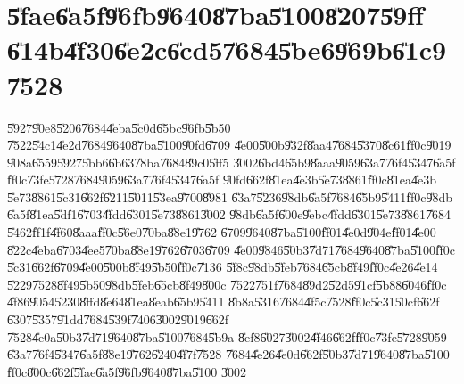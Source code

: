                       

\part{\U{5fae}\U{6a5f}\U{96fb}\U{9640}\U{87ba}\U{5100}\U{8207}\U{59ff}%
\U{614b}\U{4f30}\U{6e2c}\U{6cd5}\U{7684}\U{5be6}\U{969b}\U{61c9}\U{7528}}

\setcounter{xpage}{1}

\U{5927}\U{90e8}\U{5206}\U{7684}\U{4eba}\U{5c0d}\U{65bc}\U{96fb}\U{5b50}%
\U{7522}\U{54c1}\U{4e2d}\U{7684}\U{9640}\U{87ba}\U{5100}\U{90fd}\U{6709}%
\U{4e00}\U{500b}\U{932f}\U{8aa4}\U{7684}\U{5370}\U{8c61}\U{ff0c}\U{9019}%
\U{908a}\U{6559}\U{5927}\U{5bb6}\U{6b63}\U{78ba}\U{7684}\U{89c0}\U{5ff5}%
\U{3002}\U{6bd4}\U{65b9}\U{8aaa}\U{9059}\U{63a7}\U{76f4}\U{5347}\U{6a5f}%
\U{ff0c}\U{73fe}\U{5728}\U{7684}\U{9059}\U{63a7}\U{76f4}\U{5347}\U{6a5f}%
\U{90fd}\U{662f}\U{81ea}\U{4e3b}\U{5e73}\U{8861}\U{ff0c}\U{81ea}\U{4e3b}%
\U{5e73}\U{8861}\U{5c31}\U{662f}\U{6211}\U{5011}\U{53ea}\U{9700}\U{8981}%
\U{63a7}\U{5236}\U{98db}\U{6a5f}\U{7684}\U{65b9}\U{5411}\U{ff0c}\U{98db}%
\U{6a5f}\U{81ea}\U{5df1}\U{6703}\U{4fdd}\U{6301}\U{5e73}\U{8861}\U{3002}%
\U{98db}\U{6a5f}\U{600e}\U{9ebc}\U{4fdd}\U{6301}\U{5e73}\U{8861}\U{7684}%
\U{5462}\U{ff1f}\U{4f60}\U{8aaa}\U{ff0c}\U{56e0}\U{70ba}\U{88e1}\U{9762}%
\U{6709}\U{9640}\U{87ba}\U{5100}\U{ff01}\U{4e0d}\U{904e}\U{ff01}\U{4e00}%
\U{822c}\U{4eba}\U{6703}\U{4ee5}\U{70ba}\U{88e1}\U{9762}\U{6703}\U{6709}%
\U{4e00}\U{9846}\U{50b3}\U{7d71}\U{7684}\U{9640}\U{87ba}\U{5100}\U{ff0c}%
\U{5c31}\U{662f}\U{6709}\U{4e00}\U{500b}\U{8f49}\U{5b50}\U{ff0c}\U{7136}%
\U{5f8c}\U{98db}\U{5feb}\U{7684}\U{65cb}\U{8f49}\U{ff0c}\U{4e26}\U{4e14}%
\U{5229}\U{7528}\U{8f49}\U{5b50}\U{98db}\U{5feb}\U{65cb}\U{8f49}\U{800c}%
\U{7522}\U{751f}\U{7684}\U{89d2}\U{52d5}\U{91cf}\U{5b88}\U{6046}\U{ff0c}%
\U{4f86}\U{9054}\U{5230}\U{8ffd}\U{8e64}\U{81ea}\U{8eab}\U{65b9}\U{5411}%
\U{8b8a}\U{5316}\U{7684}\U{4f5c}\U{7528}\U{ff0c}\U{5c31}\U{50cf}\U{662f}%
\U{6307}\U{5357}\U{91dd}\U{7684}\U{539f}\U{7406}\U{3002}\U{9019}\U{662f}%
\U{7528}\U{4e0a}\U{50b3}\U{7d71}\U{9640}\U{87ba}\U{5100}\U{7684}\U{5b9a}%
\U{8ef8}\U{6027}\U{3002}\U{4f46}\U{662f}\U{ff0c}\U{73fe}\U{5728}\U{9059}%
\U{63a7}\U{76f4}\U{5347}\U{6a5f}\U{88e1}\U{9762}\U{6240}\U{4f7f}\U{7528}%
\U{7684}\U{4e26}\U{4e0d}\U{662f}\U{50b3}\U{7d71}\U{9640}\U{87ba}\U{5100}%
\U{ff0c}\U{800c}\U{662f}\U{5fae}\U{6a5f}\U{96fb}\U{9640}\U{87ba}\U{5100}%
\U{3002}

\bigskip


